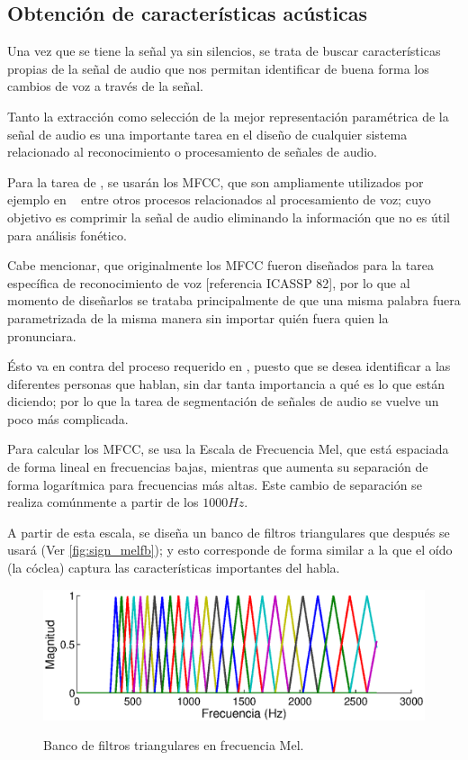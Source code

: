 \subsection{Obtención de características acústicas}

Una vez que se tiene la señal ya sin silencios, se trata de buscar características propias de la señal de audio que nos permitan identificar de buena forma los cambios de voz a través de la señal.

Tanto la extracción como selección de la mejor representación paramétrica de la señal de audio es una importante tarea en el diseño de cualquier sistema relacionado al reconocimiento o procesamiento de señales de audio. 

Para la tarea de \sd, se usarán los \ac{MFCC}, que son ampliamente utilizados por ejemplo en \sd~ entre otros procesos relacionados al procesamiento de voz; cuyo objetivo es comprimir la señal de audio eliminando la información que no es útil para análisis fonético.

Cabe mencionar, que originalmente los \ac{MFCC} fueron diseñados para la tarea específica de reconocimiento de voz [referencia ICASSP 82], por lo que al momento de diseñarlos se trataba principalmente de que una misma palabra fuera parametrizada de la misma manera sin importar quién fuera quien la pronunciara. 

Ésto va en contra del proceso requerido en \sd, puesto que se desea identificar a las diferentes personas que hablan, sin dar tanta importancia a qué es lo que están diciendo; por lo que la tarea de segmentación de señales de audio se vuelve un poco más complicada.

Para calcular los \ac{MFCC}, se usa la Escala de Frecuencia Mel, que está espaciada de forma lineal en frecuencias bajas, mientras que aumenta su separación de forma logarítmica para frecuencias más altas. Este cambio de separación se realiza comúnmente a partir de los $1000Hz$. 

A partir de esta escala, se diseña un banco de filtros triangulares que después se usará (Ver \autoref{fig:sign_melfb}); y esto corresponde de forma similar a la que el oído (la cóclea) captura las características importantes del habla. 

\begin{figure}[t]
  \myfloatalign
  {\includegraphics[width=0.9\linewidth]{gfx/chap2/mfcc_filterbank}} \quad
  \caption{Banco de filtros triangulares en frecuencia Mel.}
  \label{fig:sign_melfb}
\end{figure}  

